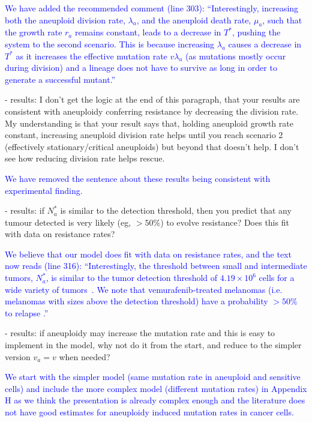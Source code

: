 \documentclass[12pt]{extarticle}
\renewcommand{\Delta}{r}
\begin{document}
\textcolor{blue}{%
We have added the recommended comment (line 303): ``Interestingly, increasing both the aneuploid division rate, $\lambda_a$, and the aneuploid death rate, $\mu_a$, such that the growth rate $\Delta_a$ remains constant, leads to a decrease in $T^*$, pushing the system to the second scenario. This is because increasing $\lambda_a$ causes a decrease in $T^*$ as  it increases the effective mutation rate $v\lambda_a$ (as mutations mostly occur during division) and a lineage does not have to survive as long in order to generate a successful mutant.''
} 

- results: I don't get the logic at the end of this paragraph, that your results are consistent with aneuploidy conferring resistance by decreasing the division rate. My understanding is that your result says that, holding aneuploid growth rate constant, increasing aneuploid division rate helps until you reach scenario 2 (effectively stationary/critical aneuploids) but beyond that doesn't help. I don't see how reducing division rate helps rescue.

\textcolor{blue}{%
We have removed the sentence about these results being consistent with experimental finding.
} 

- results: if $N_a^*$ is similar to the detection threshold, then you predict that any tumour detected is very likely (eg, $>50\%$) to evolve resistance? Does this fit with data on resistance rates?

\textcolor{blue}{ %
We believe that our model does fit with data on resistance rates, and the text now reads (line 316): ``Interestingly, the threshold between small and intermediate tumors, $N_a^*$, is similar to the tumor detection threshold of $4.19 \times 10^6$ cells for a wide variety of tumors~\citep{avanzini2019cancer}. We note that vemurafenib-treated melanomas (i.e. melanomas with sizes above the detection threshold) have a probability $>50\%$ to relapse \citep{piejko2023long,handa2022long}.''
}

- results: if aneuploidy may increase the mutation rate and this is easy to implement in the model, why not do it from the start, and reduce to the simpler version $v_a=v$ when needed?

\textcolor{blue}{
We start with the simpler model (same mutation rate in aneuploid and sensitive cells) and include the more complex model (different mutation rates) in Appendix H as we think the presentation is already complex enough and the literature does not have good estimates for aneuploidy induced mutation rates in cancer cells.
} 
\end{document}
